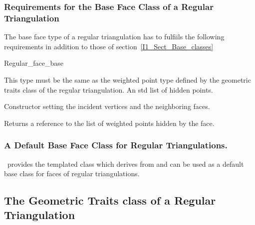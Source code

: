\subsubsection{Requirements for the Base Face Class of a Regular Triangulation}
The base face type of a regular triangulation 
has to fulfiils the following requirements
in addition to those of section~\ref{I1_Sect_Base_classes}

\begin{ccClass}{Regular_face_base}
\ccThreeToTwo

\ccTypes
{}
{This type must be the same
as the weighted point type 
defined by the geometric traits class of the regular triangulation.}
\ccGlue
{}
{An std list of hidden points.}

\ccCreation
{}
\ccGlue
{}
\ccGlue
{} {Constructor setting the incident vertices and 
the neighboring faces.}

{Returns a reference to the list of weighted points
hidden by the face.}
\end{ccClass}

\subsubsection{A Default Base Face Class for Regular Triangulations.}
\cgal\ provides the templated class 
which derives from 
and can be used as a default base class for faces of regular triangulations.


\subsection{The Geometric Traits class of a Regular Triangulation}


